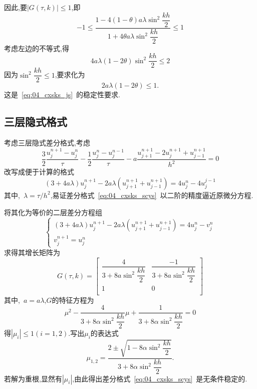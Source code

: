 因此,要$|G(\tau,k)|\leq 1$,即
\begin{equation*}
 -1\leq\dfrac{1-4(1-\theta)a\lambda\sin^2\dfrac{kh}{2}}{1+4\theta a\lambda\sin^2\dfrac{kh}{2}}\leq 1
\end{equation*}
考虑左边的不等式,得
\begin{equation*}
4a\lambda(1-2\theta)\sin^2\dfrac{kh}{2}\leq2
\end{equation*}
因为$\sin^2\dfrac{kh}{2}\leq 1$,要求化为
\begin{equation}
 2a\lambda(1-2\theta)\leq 1.
\end{equation}
这是~\eqref{eq:04_cxsks_js}~的稳定性要求.
\subsection{三层隐式格式}
考虑三层隐式差分格式,考虑
\begin{equation}\label{eq:04_cxsks_scys}
\dfrac{3}{2}\dfrac{u_j^{n+1}-u_j^n}{\tau}-\dfrac{1}{2}\dfrac{u_j^n-u_j^{n-1}}{\tau}
-a\dfrac{u_{j+1}^{n+1}-2u_{j}^{n+1}+u_{j-1}^{n+1}}{h^2}=0
\end{equation}
改写成便于计算的格式
\begin{equation}
 (3+4a\lambda)u_j^{n+1}-2a\lambda(u_{j+1}^{n+1}+u_{j-1}^{n+1})=4u_j^n-4u_j^{j-1}
\end{equation}
其中,~$\lambda=\tau/h^2$,易证差分格式~\eqref{eq:04_cxsks_scys}~以二阶的精度逼近原微分方程.\par
将其化为等价的二层差分方程组
\begin{equation*}
\begin{cases}
(3+4a\lambda)u_j^{n+1}-2a\lambda(u_{j+1}^{n+1}+u_{j-1}^{n+1})=4u_j^n-v_j^n \\
v_j^{n+1}=u_j^n
\end{cases}
\end{equation*}
求得其增长矩阵为
\begin{equation*}
 G(\tau,k)=\begin{bmatrix}
  \dfrac{4}{3+8a\sin^2\dfrac{kh}{2}} & \dfrac{-1}{3+8a\sin^2\dfrac{kh}{2}} \\
                     1		     &			0		   \\
 \end{bmatrix}
\end{equation*}
其中,~$a=a\lambda$,$G$的特征方程为
\begin{equation*}
 \mu^2-\dfrac{4}{3+8\alpha\sin^2\dfrac{kh}{2}}\mu+\dfrac{1}{3+8\alpha\sin^2\dfrac{kh}{2}}=0
\end{equation*}
得$|\mu_i|\leq1(i=1,2)$.写出$\mu_i$的表达式
\begin{equation*}
\mu_{1,2}=\dfrac{2\pm\sqrt{1-8\alpha\sin^2\dfrac{kh}{2}}}{3+8\alpha\sin^2\dfrac{kh}{2}}.
\end{equation*}
若解为重根,显然有$|\mu_i|$,由此得出差分格式~\eqref{eq:04_cxsks_scys}~是无条件稳定的.

